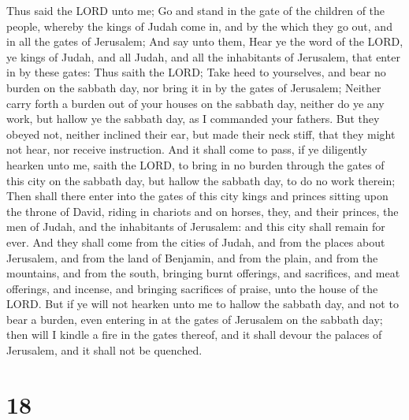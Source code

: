  Thus said the LORD unto me; Go and stand in the gate of
the children of the people, whereby the kings of Judah come in, and by
the which they go out, and in all the gates of Jerusalem; 
And say unto them, Hear ye the word of the LORD, ye kings of Judah, and
all Judah, and all the inhabitants of Jerusalem, that enter in by these
gates:  Thus saith the LORD; Take heed to yourselves, and
bear no burden on the sabbath day, nor bring it in by the gates of
Jerusalem;  Neither carry forth a burden out of your houses
on the sabbath day, neither do ye any work, but hallow ye the sabbath
day, as I commanded your fathers.  But they obeyed not,
neither inclined their ear, but made their neck stiff, that they might
not hear, nor receive instruction.  And it shall come to
pass, if ye diligently hearken unto me, saith the LORD, to bring in no
burden through the gates of this city on the sabbath day, but hallow the
sabbath day, to do no work therein;  Then shall there enter
into the gates of this city kings and princes sitting upon the throne of
David, riding in chariots and on horses, they, and their princes, the
men of Judah, and the inhabitants of Jerusalem: and this city shall
remain for ever.  And they shall come from the cities of
Judah, and from the places about Jerusalem, and from the land of
Benjamin, and from the plain, and from the mountains, and from the
south, bringing burnt offerings, and sacrifices, and meat offerings, and
incense, and bringing sacrifices of praise, unto the house of the LORD.
 But if ye will not hearken unto me to hallow the sabbath
day, and not to bear a burden, even entering in at the gates of
Jerusalem on the sabbath day; then will I kindle a fire in the gates
thereof, and it shall devour the palaces of Jerusalem, and it shall not
be quenched.

\hypertarget{section-17}{%
\section{18}\label{section-17}}


